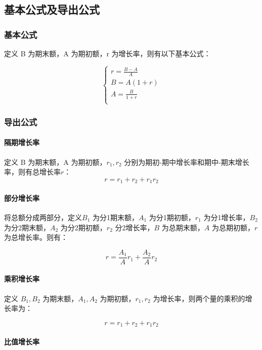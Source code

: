 \subsection{基本公式及导出公式}

\subsubsection{基本公式}

定义 B 为期末额，A 为期初额，r 为增长率，则有以下基本公式：

\begin{equation*}
	\begin{cases}
		r = \frac{B-A}{A} \\
		B = A(1+r)        \\
		A = \frac{B}{1+r} \\
	\end{cases}
\end{equation*}

\subsubsection{导出公式}
\paragraph{隔期增长率}
定义 B 为期末额，A 为期初额，$r_1,r_2$ 分别为期初-期中增长率和期中-期末增长率，则有总增长率$r$：
\[
	r = r_1 + r_2 + r_1r_2
\]

\paragraph{部分增长率}

将总额分成两部分，定义$B_1$ 为分1期末额，$A_1$ 为分1期初额，$r_1$ 为分1增长率，$B_2$ 为分2期末额，$A_2$ 为分2期初额，$r_2$ 分2增长率，$B$ 为总期末额，$A$ 为总期初额，$r$ 为总增长率。则有：

\[
	r = \frac{A_1}{A}r_1 + \frac{A_2}{A}r_2
\]

\paragraph{乘积增长率}

定义 $B_1,B_2$ 为期末额，$A_1,A_2$ 为期初额，$r_1,r_2$ 为增长率，则两个量的乘积的增长率为：

\[
	r = r_1 + r_2 + r_1r_2
\]

\paragraph{比值增长率}

